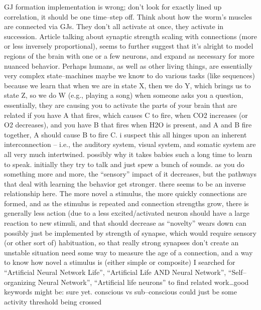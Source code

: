 \documentclass[11pt, a4paper, oneside]{article}   	%
\begin{document}
\begin{outline}
\point GJ formation implementation is wrong; don't look for exactly lined up correlation, it should be one time--step off. Think about how the worm's muscles are connected via GJs. They don't all activate at once, they activate in succession.
\point Article talking about synaptic strength scaling with connections (more or less inversely proportional), seems to further suggest that it's alright to model regions of the brain with one or a few neurons, and expand as necessary for more nuanced behavior.
\point Perhaps humans, as well as other living things, are essentially very complex state--machines
    \subpoint maybe we know to do various tasks (like sequences) because we learn that when we are in state X, then we do Y, which brings us to state Z, so we do W (e.g., playing a song)
\point when someone asks you a question, essentially, they are causing you to activate the parts of your brain that are related 
\point if you have A that fires, which causes C to fire, when CO2 increases (or O2 decreases), and you have B that fires when H2O is present, and A and B fire together, A should cause B to fire C.
    \subpoint i suspect this all hinges upon an inherent interconnection  -- i.e., the auditory system, visual system, and somatic system are all very much intertwined.
        \subsubpoint possibly why it takes babies such a long time to learn to speak. initially they try to talk and just spew a bunch of sounds.
\point as you do something more and more, the ``sensory'' impact of it decreases, but the pathways that deal with learning the behavior get stronger.
    \subpoint there seems to be an inverse relationship here. The more novel a stimulus, the more quickly connections are formed, and as the stimulus is repeated and connection strengths grow, there is generally less action (due to a less excited/activated neuron
        \subsubpoint should have a large reaction to new stimuli, and that should decrease as ``novelty'' wears down
            \supersubpoint can possibly just be implemented by strength of synapse, which would require sensory (or other sort of) habituation, so that really strong synapses don't create an unstable situation
        \subsubpoint need some way to measure the age of a connection, and a way to know how novel a stimulus is (either simple or composite)
\point I searched for ``Artificial Neural Network Life'', ``Artificial Life AND Neural Network'', ``Self--organizing Neural Network'', ``Artificial life neurons'' to find related work\ldots good keywords might be:
    \subpoint \ldotsnot sure yet.
\point conscious vs sub--conscious could just be some activity threshold being crossed
\end{outline}
\end{document}

